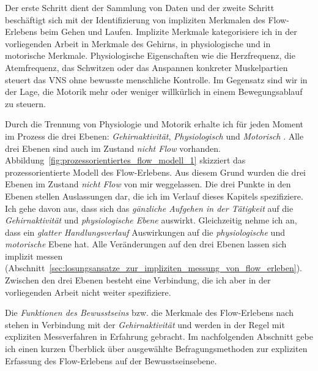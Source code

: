 Der erste Schritt dient der Sammlung von Daten und der zweite Schritt beschäftigt sich mit der Identifizierung von impliziten Merkmalen des Flow-Erlebens beim Gehen und Laufen. Implizite Merkmale kategorisiere ich in der vorliegenden Arbeit in Merkmale des Gehirns, in physiologische und in motorische Merkmale. Physiologische Eigenschaften wie die Herzfrequenz, die Atemfrequenz, das Schwitzen oder das Anspannen konkreter Muskelpartien steuert das \ac{VNS} ohne bewusste menschliche Kontrolle. Im Gegensatz sind wir in der Lage, die Motorik mehr oder weniger willkürlich in einem Bewegungsablauf zu steuern. 

Durch die Trennung von Physiologie und Motorik erhalte ich für jeden Moment im Prozess die drei Ebenen: \emph{Gehirnaktivität}, \emph{Physiologisch} und \emph{Motorisch} \citep[][S.~15]{Grueter2016a}. Alle drei Ebenen sind auch im Zustand \emph{nicht Flow} vorhanden. Abbildung~\ref{fig:prozessorientiertes_flow_modell_1} skizziert das prozessorientierte Modell des Flow-Erlebens. Aus diesem Grund wurden die drei Ebenen im Zustand \emph{nicht Flow} von mir weggelassen. Die drei Punkte in den Ebenen stellen Auslassungen dar, die ich im Verlauf dieses Kapitels spezifiziere. Ich gehe davon aus, dass sich das \emph{gänzliche Aufgehen in der Tätigkeit} auf die \emph{Gehirnaktivität} und \emph{physiologische Ebene} auswirkt. Gleichzeitig nehme ich an, dass ein \emph{glatter Handlungsverlauf} Auswirkungen auf die \emph{physiologische} und \emph{motorische} Ebene hat. Alle Veränderungen auf den drei Ebenen lassen sich implizit messen (Abschnitt~\ref{sec:losungsansatze_zur_impliziten_messung_von_flow_erleben}). Zwischen den drei Ebenen besteht eine Verbindung, die ich aber in der vorliegenden Arbeit nicht weiter spezifiziere. 

Die \emph{Funktionen des Bewusstseins} bzw. die Merkmale des Flow-Erlebens nach \citet{Henk2014} stehen in Verbindung mit der \emph{Gehirnaktivität} und werden in der Regel mit expliziten Messverfahren in Erfahrung gebracht. Im nachfolgenden Abschnitt gebe ich einen kurzen Überblick über ausgewählte Befragungsmethoden zur expliziten Erfassung des Flow-Erlebens auf der Bewusstseinsebene. 

